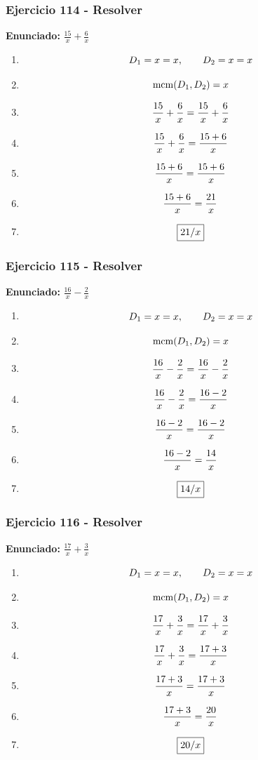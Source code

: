 \documentclass[11pt,a4paper]{article}
\newcommand{\fitmath}[1]{%
\[
\setbox0=\hbox{$\displaystyle #1$}%
\ifdim\wd0>\linewidth
\resizebox{\linewidth}{!}{$\displaystyle #1$}%
\else
#1%
\fi
\]
}
\begin{document}
\subsubsection*{Ejercicio 114 - Resolver}
\textbf{Enunciado:} $ \frac{15}{x} + \frac{6}{x} $\par
\begin{enumerate}[leftmargin=2em]
\item \fitmath{D_1=x=x,\qquad D_2=x=x}
\item \fitmath{\operatorname{mcm}(D_1,D_2)=x}
\item \fitmath{\frac{15}{x} + \frac{6}{x}= \frac{15}{x} + \frac{6}{x}}
\item \fitmath{\frac{15}{x} + \frac{6}{x}=\frac{15 + 6}{x}}
\item \fitmath{\frac{15 + 6}{x}=\frac{15 + 6}{x}}
\item \fitmath{\frac{15 + 6}{x}=\frac{21}{x}}
\item \fitmath{\boxed{21 / x}}
\end{enumerate}

\vspace{0.12cm}
\subsubsection*{Ejercicio 115 - Resolver}
\textbf{Enunciado:} $ \frac{16}{x} - \frac{2}{x} $\par
\begin{enumerate}[leftmargin=2em]
\item \fitmath{D_1=x=x,\qquad D_2=x=x}
\item \fitmath{\operatorname{mcm}(D_1,D_2)=x}
\item \fitmath{\frac{16}{x} - \frac{2}{x}= \frac{16}{x} - \frac{2}{x}}
\item \fitmath{\frac{16}{x} - \frac{2}{x}=\frac{16 - 2}{x}}
\item \fitmath{\frac{16 - 2}{x}=\frac{16 - 2}{x}}
\item \fitmath{\frac{16 - 2}{x}=\frac{14}{x}}
\item \fitmath{\boxed{14 / x}}
\end{enumerate}

\vspace{0.12cm}
\subsubsection*{Ejercicio 116 - Resolver}
\textbf{Enunciado:} $ \frac{17}{x} + \frac{3}{x} $\par
\begin{enumerate}[leftmargin=2em]
\item \fitmath{D_1=x=x,\qquad D_2=x=x}
\item \fitmath{\operatorname{mcm}(D_1,D_2)=x}
\item \fitmath{\frac{17}{x} + \frac{3}{x}= \frac{17}{x} + \frac{3}{x}}
\item \fitmath{\frac{17}{x} + \frac{3}{x}=\frac{17 + 3}{x}}
\item \fitmath{\frac{17 + 3}{x}=\frac{17 + 3}{x}}
\item \fitmath{\frac{17 + 3}{x}=\frac{20}{x}}
\item \fitmath{\boxed{20 / x}}
\end{enumerate}
\end{document}
